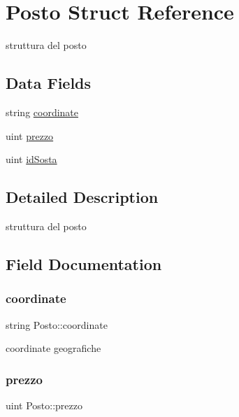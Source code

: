 \hypertarget{struct_posto}{}\section{Posto Struct Reference}
\label{struct_posto}


struttura del posto  


\subsection*{Data Fields}
\begin{DoxyCompactItemize}
\item 
string \mbox{\hyperlink{struct_posto_af865fc4a0261bf904af5128ffdac52a3}{coordinate}}
\item 
uint \mbox{\hyperlink{struct_posto_a8fcf46e5fba35fee4679f2ff5b9b3975}{prezzo}}
\item 
uint \mbox{\hyperlink{struct_posto_a612bd6f6aa55358575186039c087505b}{id\+Sosta}}
\end{DoxyCompactItemize}


\subsection{Detailed Description}
struttura del posto 

\subsection{Field Documentation}
\mbox{\label{struct_posto_af865fc4a0261bf904af5128ffdac52a3}} 
\subsubsection{\texorpdfstring{coordinate}{coordinate}}
{\footnotesize\ttfamily string Posto\+::coordinate}

coordinate geografiche \mbox{\label{struct_posto_a8fcf46e5fba35fee4679f2ff5b9b3975}} 
\subsubsection{\texorpdfstring{prezzo}{prezzo}}
{\footnotesize\ttfamily uint Posto\+::prezzo}

